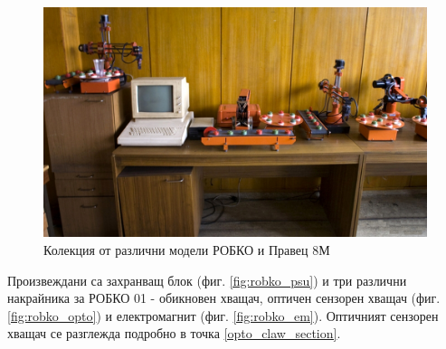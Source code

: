 \begin{figure}
    \centering
    \includegraphics[width=\linewidth]{pictures/robko_collection.jpg}
    \caption{Колекция от различни модели РОБКО и Правец 8М}
    \label{fig:collection}
\end{figure}
Произвеждани са захранващ блок (фиг. \ref{fig:robko_psu}) и три различни накрайника за РОБКО 01 - обикновен хващач, оптичен сензорен хващач (фиг. \ref{fig:robko_opto}) и електромагнит (фиг. \ref{fig:robko_em}). Оптичният сензорен хващач се разглежда подробно в точка \ref{opto_claw_section}.
